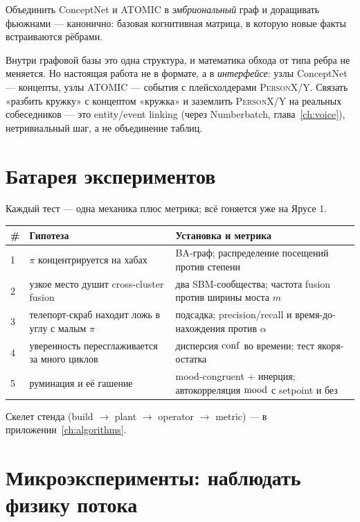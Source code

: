 Объединить ConceptNet и ATOMIC в \emph{эмбриональный} граф и доращивать фьюжнами —
канонично: базовая когнитивная матрица, в которую новые факты встраиваются рёбрами.

\begin{pitfall}
Внутри графовой базы это одна структура, и математика обхода от типа ребра не меняется.
Но настоящая работа не в формате, а в \emph{интерфейсе}: узлы ConceptNet — концепты,
узлы ATOMIC — события с плейсхолдерами \textsc{PersonX/Y}. Связать «разбить кружку» с
концептом «кружка» и заземлить \textsc{PersonX/Y} на реальных собеседников — это
entity/event linking (через Numberbatch, глава~\ref{ch:voice}), нетривиальный шаг, а
не объединение таблиц.
\end{pitfall}

\section{Батарея экспериментов}

Каждый тест — одна механика плюс метрика; всё гоняется уже на Ярусе 1.

\begin{center}
\begin{tabular}{p{} p{} p{}}
\toprule
\# & \textbf{Гипотеза} & \textbf{Установка и метрика} \\
\midrule
1 & $\pi$ концентрируется на хабах & BA-граф; распределение посещений против степени \\
2 & узкое место душит cross-cluster fusion & два SBM-сообщества; частота fusion против
ширины моста $m$ \\
3 & телепорт-скраб находит ложь в углу с малым $\pi$ & подсадка; precision/recall и
время-до-нахождения против $\alpha$ \\
4 & уверенность пересглаживается за много циклов & дисперсия $\mathrm{conf}$ во времени; тест
якоря-остатка \\
5 & руминация и её гашение & mood-congruent $+$ инерция; автокорреляция $\mathrm{mood}$ с
setpoint и без \\
\bottomrule
\end{tabular}
\end{center}

Скелет стенда (build $\to$ plant $\to$ operator $\to$ metric) — в
приложении~\ref{ch:algorithms}.

\section{Микроэксперименты: наблюдать физику потока}

